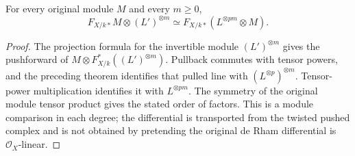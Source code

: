 \begin{corollary}
\label{cor:kn-frobenius-line-projection}
\leanok
{}
For every original module $M$ and every $m\geq0$,
\[
 F_{X/k*}M\otimes (L')^{\otimes m}
 \simeq F_{X/k*}(L^{\otimes pm}\otimes M).
\]
\end{corollary}
\begin{proof}
The projection formula for the invertible module $(L')^{\otimes m}$
gives the pushforward of $M\otimes F_{X/k}^*((L')^{\otimes m})$.
Pullback commutes with tensor powers, and the preceding theorem
identifies that pulled line with $(L^{\otimes p})^{\otimes m}$.
Tensor-power multiplication identifies it with $L^{\otimes pm}$.
The symmetry of the original module tensor product gives the stated
order of factors.  This is a module comparison in each degree; the
differential is transported from the twisted pushed complex and is
not obtained by pretending the original de Rham differential is
$\mathcal O_X$-linear.
\end{proof}
